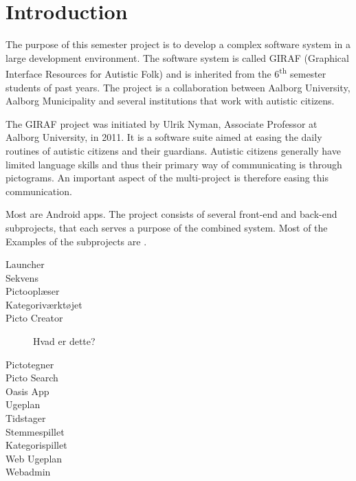 \chapter{Introduction}
The purpose of this semester project is to develop a complex software system in a large development environment. The software system is called GIRAF (Graphical Interface Resources for Autistic Folk) and is inherited from the 6\textsuperscript{th} semester students of past years. The project is a collaboration between Aalborg University, Aalborg Municipality and several institutions that work with autistic citizens. 

The GIRAF project was initiated by Ulrik Nyman, Associate Professor at Aalborg University, in 2011. It is a software suite aimed at easing the daily routines of autistic citizens and their guardians. Autistic citizens generally have limited language skills and thus their primary way of communicating is through pictograms. An important aspect of the multi-project is therefore easing this communication.

Most are Android apps.
The project consists of several front-end and back-end subprojects, that each serves a purpose of the combined system. Most of the Examples of the subprojects are .

\begin{description}
  \item[Launcher] \dummy
  \item[Sekvens]
  \item[Pictooplæser]
	\item[Kategoriværktøjet] \dummy
  \item[Picto Creator] Hvad er dette?
  \item[Pictotegner]
  \item[Picto Search] \dummy
  \item[Oasis App]
  \item[Ugeplan]
  \item[Tidstager] 
  \item[Stemmespillet]
  \item[Kategorispillet]
  \item[Web Ugeplan]
  \item[Webadmin]
\end{description}

